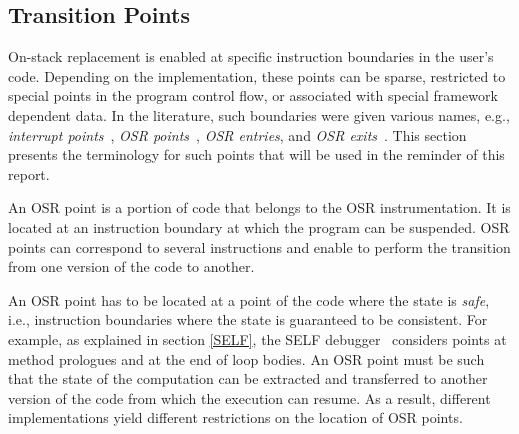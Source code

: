 \subsection{Transition Points}\label{section:osrpoints}
On-stack replacement is enabled at specific instruction boundaries in the user's code.
Depending on the implementation, these points can be sparse, restricted to special points in the program control flow, or associated with special framework dependent data.
In the literature, such boundaries were given various names, e.g., \textit{interrupt points}~\cite{holzle1992debugging}, \textit{OSR points}~\cite{fink2003design, holzle1992debugging, WebKitURL, lameed2013modular}, \textit{OSR entries}, and \textit{OSR exits}~\cite{WebKitURL, lameed2013modular}.
This section presents the terminology for such points that will be used in the reminder of this report.

\begin{definition}\label{OSRPointDefinition}
An OSR point is a portion of code that belongs to the OSR instrumentation.
It is located at an instruction boundary at which the program can be suspended.
OSR points can correspond to several instructions and enable to perform the transition from one version of the code to another.
\end{definition}

An OSR point has to be located at a point of the code where the state is \textit{safe}, i.e., instruction boundaries where the state is guaranteed to be consistent.
For example, as explained in section \ref{SELF}, the SELF debugger~\cite{holzle1992debugging} considers points at method prologues and at the end of loop bodies.
An OSR point must be such that the state of the computation can be extracted and transferred to another version of the code from which the execution can resume.
As a result, different implementations yield different restrictions on the location of OSR points.\\

